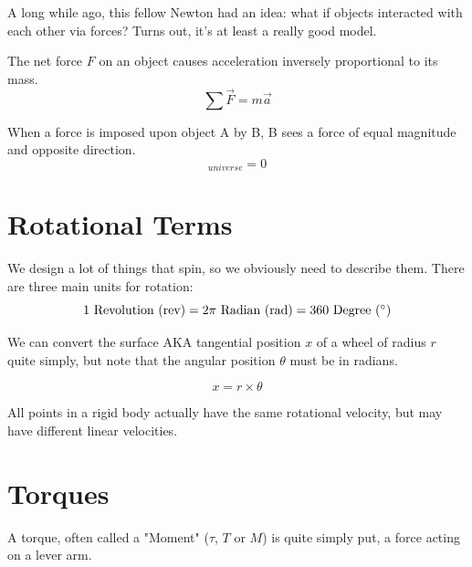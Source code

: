 \documentclass{article}%
\newenvironment{block}[1]{
	\tcolorbox[beamer,
	noparskip,breakable,
	colback=LightGreen,colframe=DarkGreen,
	colbacklower=LimeGreen!75!LightGreen,
	title=#1]}
	{\endtcolorbox}
\begin{document}
A long while ago, this fellow Newton had an idea: what if objects interacted with each other via forces?
Turns out, it's at least a really good model.


\begin{block}{Principle 1 - Proportionality}
	The net force $F$ on an object causes acceleration inversely proportional to its mass.
	\begin{equation}
		\sum \vec{F} = m \vec{a}
	\end{equation}
\end{block}


\begin{block}{Principle 2 - Reciprocity}
	When a force is imposed upon object A by B, B sees a force of equal magnitude and opposite direction.
	\begin{equation}
		[\sum \vec{F}]_{universe} = 0
	\end{equation}
\end{block}


\section{Rotational Terms}

We design a lot of things that spin, so we obviously need to describe them. There are three main units for rotation:
\begin{equation}
	1 \mbox{ Revolution (rev)} = 2 \pi \mbox{ Radian (rad)} = 360 \mbox{ Degree (\degree)} \nonumber
\end{equation}


We can convert the surface AKA tangential position $x$ of a wheel of radius $r$ quite simply, but note that the angular position $\theta$ must be in radians.

\begin{equation} 
	x = r \times \theta
\end{equation}

\begin{block}{Note}
	All points in a rigid body actually have the same rotational velocity, but may have different linear velocities.
\end{block}

\section{Torques}

A torque, often called a "Moment" ($\tau$, $T$ or $M$) is quite simply put, a force acting on a lever arm.
\end{document}
